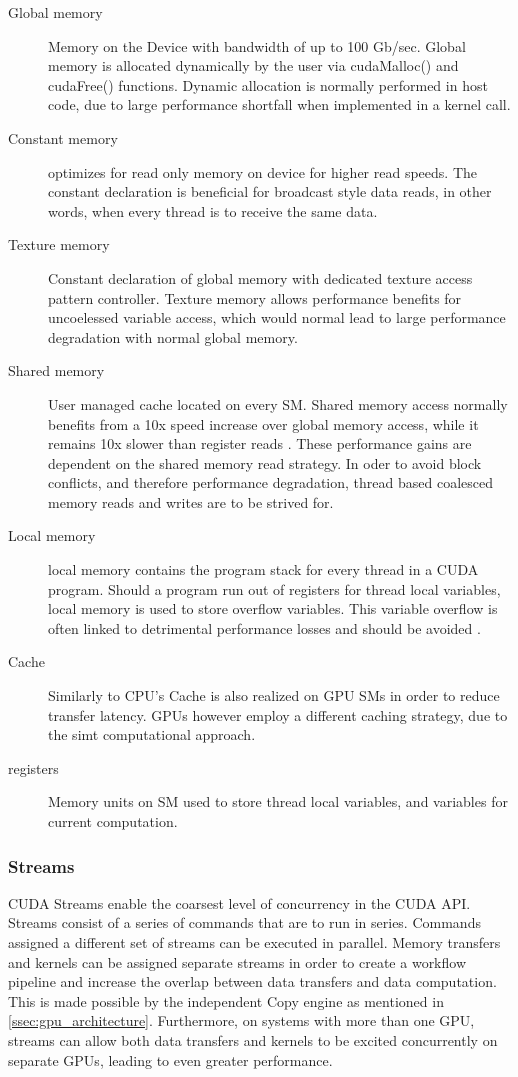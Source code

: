 \begin{description}
  \item [Global memory] Memory on the Device with bandwidth of up to 100 Gb/sec.
  Global memory is allocated dynamically by the user via cudaMalloc() and cudaFree() functions.
  Dynamic allocation is normally performed in host code, due to large performance shortfall
  when implemented in a kernel call.
  \item [Constant memory] optimizes for read only memory on device for higher
  read speeds.  The constant declaration is beneficial for broadcast style data
  reads, in other words, when every thread is to receive the same data.
  \item [Texture memory] Constant declaration of global memory with dedicated
   texture access pattern controller.  Texture memory allows performance benefits
   for uncoelessed variable access, which would normal lead to large performance
   degradation with normal global memory.
  \item [Shared memory] User managed cache located on every \Gls{SM}.  Shared memory access
  normally benefits from a 10x speed increase over global memory access, while it remains
  10x slower than register reads \cite{Wilt}.  These performance gains are dependent
  on the shared memory read strategy.  In oder to avoid block conflicts, and therefore
  performance degradation, thread based coalesced memory reads and writes are to
  be strived for.
  \item [Local memory] local memory contains the program stack for every thread
  in a CUDA program. Should a program run out of registers for thread local variables,
  local memory is  used to store overflow variables. This variable overflow is often
  linked to detrimental performance losses and should be avoided \cite{Wilt}.
  \item [Cache] Similarly to CPU's Cache is also realized on GPU \glspl{SM} in order
  to reduce transfer latency.  \glspl{GPU} however employ a different caching strategy,
  due to the \gls{simt} computational approach.
  \item [registers] Memory units on \Gls{SM} used to store thread local variables,
                    and variables for current computation.
\end{description}

\subsubsection{Streams}\label{sssec:streams}
CUDA Streams enable the coarsest level of concurrency in the CUDA API.  Streams
 consist of a series of commands that are to run in series.  Commands assigned
a different set of streams can be executed in parallel. Memory transfers and
kernels can be assigned separate streams in order to create a workflow pipeline and increase
the overlap between data transfers and data computation. This is made possible by the
independent Copy engine as mentioned in \ref{ssec:gpu_architecture}.  Furthermore,
on systems with more than one \Gls{GPU}, streams can allow both data transfers and
kernels to be excited concurrently on separate \Glspl{GPU}, leading to even greater
performance.
